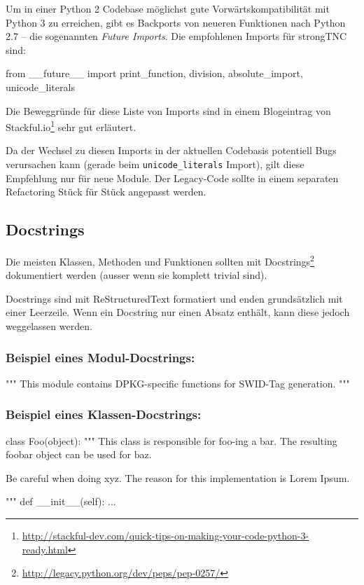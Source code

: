 Um in einer Python 2 Codebase möglichst gute Vorwärtskompatibilität mit Python 3
zu erreichen, gibt es Backports von neueren Funktionen nach Python 2.7 -- die
sogenannten \textit{Future Imports}. Die empfohlenen Imports für strongTNC sind:

\begin{pythoncode}
from __future__ import print_function, division, absolute_import, unicode_literals
\end{pythoncode}

\noindent Die Beweggründe für diese Liste von Imports sind in einem Blogeintrag
von Stackful.io\footnote{\url{http://stackful-dev.com/quick-tips-on-making-your-code-python-3-ready.html}}
sehr gut erläutert.

Da der Wechsel zu diesen Imports in der aktuellen Codebasis potentiell Bugs
verursachen kann (gerade beim \texttt{unicode\_literals} Import), gilt diese
Empfehlung nur für neue Module. Der Legacy-Code sollte in einem separaten
Refactoring Stück für Stück angepasst werden.


\subsection{Docstrings}

Die meisten Klassen, Methoden und Funktionen sollten mit
Docstrings\footnote{\url{http://legacy.python.org/dev/peps/pep-0257/}}
dokumentiert werden (ausser wenn sie komplett trivial sind).

Docstrings sind mit ReStructuredText formatiert und enden grundsätzlich mit
einer Leerzeile. Wenn ein Docstring nur einen Absatz enthält, kann diese jedoch
weggelassen werden.

\subsubsection*{Beispiel eines Modul-Docstrings:}

\begin{pythoncode}
"""
This module contains DPKG-specific functions for SWID-Tag generation.
"""
\end{pythoncode}

\subsubsection*{Beispiel eines Klassen-Docstrings:}

\begin{pythoncode}
class Foo(object):
    """
    This class is responsible for foo-ing a bar. The resulting foobar object
    can be used for baz.

    Be careful when doing xyz. The reason for this implementation is Lorem
    Ipsum.

    """
    def __init__(self):
        ...
\end{pythoncode}

